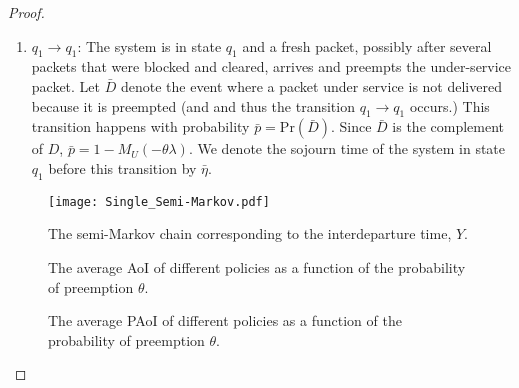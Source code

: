 \documentclass[conference]{IEEEtran}
\def\blue{\textcolor{blue}}
\newcommand{\RY}[1]{{\color{red} RY: #1}}
\newcommand{\Dbar}{\bar{D}}
\begin{document}
\begin{proof}
\begin{enumerate}
\item $q_{1}\rightarrow q_{1}$: The system is in state $q_{1}$ and a fresh packet, possibly after several packets that were blocked and cleared, arrives and preempts the under-service packet. 
Let $\Dbar$ denote the event where a packet under service is not delivered because it is preempted (and 
and thus the transition $q_{1}\rightarrow q_{1}$ occurs.) This transition happens with probability $\bar p=\mathrm{Pr}(\Dbar)$. Since $\Dbar$ is the complement of $D$, $\bar p=1-M_{U}(-\theta\lambda)$. We denote the sojourn time of the system in state $q_{1}$ before this transition by $\bar\eta$.
\end{enumerate}


\begin{figure}
\centering
\texttt{[image: Single\_Semi-Markov.pdf]}\vspace{-2mm}
\caption{The semi-Markov chain corresponding to the interdeparture time, $Y$. }  
\label{Semi-Chain_c}
\vspace{-4mm}
\end{figure}



\begin{figure*}[h]
\centering
\subfigure[$\lambda=0.2$]{
\texttt{[image: P2]}
\label{FP2}
}
\subfigure[$\lambda=1$]
{
\texttt{[image: 1]}
\label{F1}
}
\subfigure[$\lambda=2$]{
\texttt{[image: 2]}
\label{F2}
}
\subfigure[$\lambda=3$]{
\texttt{[image: 3]}
\label{F3}
}%
\caption{The average AoI of different policies as a function of the probability of preemption $\theta$. %
}
\label{Versus_P}
\vspace{-3mm}
\end{figure*}


\begin{figure*}[h]
\centering
{}
\vspace{-2mm}
\caption{The average PAoI of different policies as a function of the probability of preemption $\theta$. %
}
\label{Peak_Versus_P}
\vspace{-4mm}
\end{figure*}









\end{proof}
\end{document}
